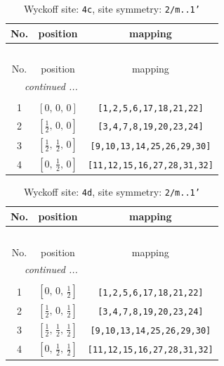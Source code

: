 \documentclass[fleqn,8pt]{jsarticle}
\begin{document}
\renewcommand{\arraystretch}{1.2}
\begin{longtable}{ccc}
\caption{Wyckoff site: {\tt 4c}, site symmetry: {\tt 2/m..1'}}
 \\
 \hline \hline
No. & position & mapping \\ \hline \endfirsthead

\multicolumn{2}{l}{\tablename\ \thetable{}} \\
 \hline \hline
No. & position & mapping \\ \hline \endhead

 \hline \hline
\multicolumn{2}{r}{\footnotesize\it continued ...} \\ \endfoot

 \hline \hline
\multicolumn{2}{r}{} \\ \endlastfoot

1 & $\left[ 0,\, 0,\, 0 \right]$ & {\tt [1,2,5,6,17,18,21,22]} \\ \hline
2 & $\left[ \frac{1}{2},\, 0,\, 0 \right]$ & {\tt [3,4,7,8,19,20,23,24]} \\ \hline
3 & $\left[ \frac{1}{2},\, \frac{1}{2},\, 0 \right]$ & {\tt [9,10,13,14,25,26,29,30]} \\ \hline
4 & $\left[ 0,\, \frac{1}{2},\, 0 \right]$ & {\tt [11,12,15,16,27,28,31,32]} \\
\end{longtable}
\renewcommand{\arraystretch}{1.2}
\begin{longtable}{ccc}
\caption{Wyckoff site: {\tt 4d}, site symmetry: {\tt 2/m..1'}}
 \\
 \hline \hline
No. & position & mapping \\ \hline \endfirsthead

\multicolumn{2}{l}{\tablename\ \thetable{}} \\
 \hline \hline
No. & position & mapping \\ \hline \endhead

 \hline \hline
\multicolumn{2}{r}{\footnotesize\it continued ...} \\ \endfoot

 \hline \hline
\multicolumn{2}{r}{} \\ \endlastfoot

1 & $\left[ 0,\, 0,\, \frac{1}{2} \right]$ & {\tt [1,2,5,6,17,18,21,22]} \\ \hline
2 & $\left[ \frac{1}{2},\, 0,\, \frac{1}{2} \right]$ & {\tt [3,4,7,8,19,20,23,24]} \\ \hline
3 & $\left[ \frac{1}{2},\, \frac{1}{2},\, \frac{1}{2} \right]$ & {\tt [9,10,13,14,25,26,29,30]} \\ \hline
4 & $\left[ 0,\, \frac{1}{2},\, \frac{1}{2} \right]$ & {\tt [11,12,15,16,27,28,31,32]} \\
\end{longtable}
\end{document}
